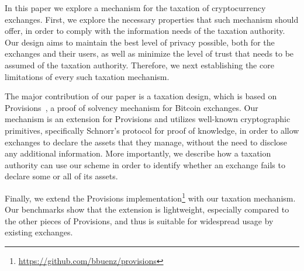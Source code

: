 In this paper we explore a mechanism for the taxation of cryptocurrency
exchanges. First, we explore the necessary properties that such mechanism
should offer, in order to comply with the information needs of the taxation
authority. Our design aims to maintain the best level of privacy possible, both
for the exchanges and their users, as well as minimize the level of trust that
needs to be assumed of the taxation authority. Therefore, we next establishing
the core limitations of every such taxation mechanism.

The major contribution of our paper is a taxation design, which is based on
Provisions~\cite{CCS:DBBCB15}, a proof of solvency mechanism for Bitcoin
exchanges. Our mechanism is an extension for Provisions and utilizes well-known
cryptographic primitives, specifically Schnorr's protocol for proof of
knowledge, in order to allow exchanges to declare the assets that they manage,
without the need to disclose any additional information. More importantly, we
describe how a taxation authority can use our scheme in order to identify
whether an exchange fails to declare some or all of its assets.

Finally, we extend the Provisions
implementation\footnote{\url{https://github.com/bbuenz/provisions}} with our
taxation mechanism.  Our benchmarks show that the extension is lightweight,
especially compared to the other pieces of Provisions, and thus is suitable for
widespread usage by existing exchanges.
